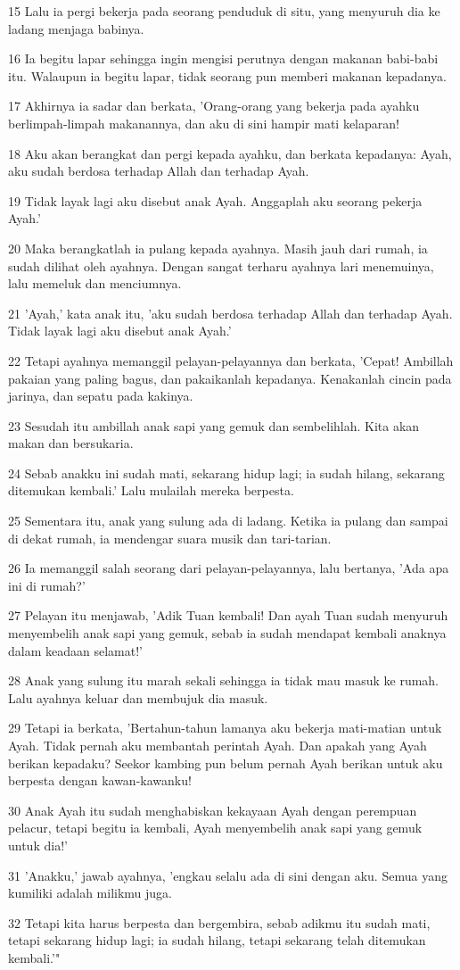\par 15 Lalu ia pergi bekerja pada seorang penduduk di situ, yang menyuruh dia ke ladang menjaga babinya.
\par 16 Ia begitu lapar sehingga ingin mengisi perutnya dengan makanan babi-babi itu. Walaupun ia begitu lapar, tidak seorang pun memberi makanan kepadanya.
\par 17 Akhirnya ia sadar dan berkata, 'Orang-orang yang bekerja pada ayahku berlimpah-limpah makanannya, dan aku di sini hampir mati kelaparan!
\par 18 Aku akan berangkat dan pergi kepada ayahku, dan berkata kepadanya: Ayah, aku sudah berdosa terhadap Allah dan terhadap Ayah.
\par 19 Tidak layak lagi aku disebut anak Ayah. Anggaplah aku seorang pekerja Ayah.'
\par 20 Maka berangkatlah ia pulang kepada ayahnya. Masih jauh dari rumah, ia sudah dilihat oleh ayahnya. Dengan sangat terharu ayahnya lari menemuinya, lalu memeluk dan menciumnya.
\par 21 'Ayah,' kata anak itu, 'aku sudah berdosa terhadap Allah dan terhadap Ayah. Tidak layak lagi aku disebut anak Ayah.'
\par 22 Tetapi ayahnya memanggil pelayan-pelayannya dan berkata, 'Cepat! Ambillah pakaian yang paling bagus, dan pakaikanlah kepadanya. Kenakanlah cincin pada jarinya, dan sepatu pada kakinya.
\par 23 Sesudah itu ambillah anak sapi yang gemuk dan sembelihlah. Kita akan makan dan bersukaria.
\par 24 Sebab anakku ini sudah mati, sekarang hidup lagi; ia sudah hilang, sekarang ditemukan kembali.' Lalu mulailah mereka berpesta.
\par 25 Sementara itu, anak yang sulung ada di ladang. Ketika ia pulang dan sampai di dekat rumah, ia mendengar suara musik dan tari-tarian.
\par 26 Ia memanggil salah seorang dari pelayan-pelayannya, lalu bertanya, 'Ada apa ini di rumah?'
\par 27 Pelayan itu menjawab, 'Adik Tuan kembali! Dan ayah Tuan sudah menyuruh menyembelih anak sapi yang gemuk, sebab ia sudah mendapat kembali anaknya dalam keadaan selamat!'
\par 28 Anak yang sulung itu marah sekali sehingga ia tidak mau masuk ke rumah. Lalu ayahnya keluar dan membujuk dia masuk.
\par 29 Tetapi ia berkata, 'Bertahun-tahun lamanya aku bekerja mati-matian untuk Ayah. Tidak pernah aku membantah perintah Ayah. Dan apakah yang Ayah berikan kepadaku? Seekor kambing pun belum pernah Ayah berikan untuk aku berpesta dengan kawan-kawanku!
\par 30 Anak Ayah itu sudah menghabiskan kekayaan Ayah dengan perempuan pelacur, tetapi begitu ia kembali, Ayah menyembelih anak sapi yang gemuk untuk dia!'
\par 31 'Anakku,' jawab ayahnya, 'engkau selalu ada di sini dengan aku. Semua yang kumiliki adalah milikmu juga.
\par 32 Tetapi kita harus berpesta dan bergembira, sebab adikmu itu sudah mati, tetapi sekarang hidup lagi; ia sudah hilang, tetapi sekarang telah ditemukan kembali.'"

